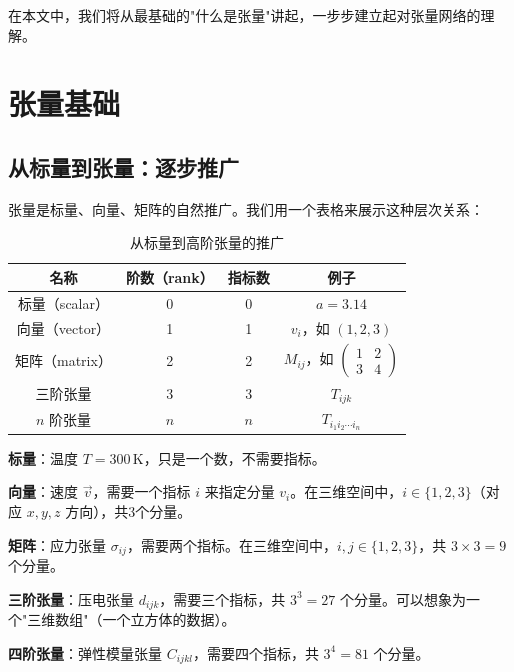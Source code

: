 \documentclass[12pt,a4paper]{ctexart}
\begin{document}
在本文中，我们将从最基础的"什么是张量"讲起，一步步建立起对张量网络的理解。

\section{张量基础}

\subsection{从标量到张量：逐步推广}

张量是标量、向量、矩阵的自然推广。我们用一个表格来展示这种层次关系：

\begin{table}[H]
\centering
\begin{tabular}{cccc}
\toprule
\textbf{名称} & \textbf{阶数（rank）} & \textbf{指标数} & \textbf{例子} \\
\midrule
标量（scalar） & 0 & 0 & $a = 3.14$ \\
向量（vector） & 1 & 1 & $v_i$，如 $(1, 2, 3)$ \\
矩阵（matrix） & 2 & 2 & $M_{ij}$，如 $\begin{pmatrix} 1 & 2 \\ 3 & 4 \end{pmatrix}$ \\
三阶张量 & 3 & 3 & $T_{ijk}$ \\
$n$ 阶张量 & $n$ & $n$ & $T_{i_1 i_2 \cdots i_n}$ \\
\bottomrule
\end{tabular}
\caption{从标量到高阶张量的推广}
\end{table}

\begin{examplebox}[例1：理解张量的阶]
\textbf{标量}：温度 $T = 300\,\text{K}$，只是一个数，不需要指标。

\textbf{向量}：速度 $\vec{v}$，需要一个指标 $i$ 来指定分量 $v_i$。在三维空间中，$i \in \{1,2,3\}$（对应 $x,y,z$ 方向），共3个分量。

\textbf{矩阵}：应力张量 $\sigma_{ij}$，需要两个指标。在三维空间中，$i,j \in \{1,2,3\}$，共 $3\times 3 = 9$ 个分量。

\textbf{三阶张量}：压电张量 $d_{ijk}$，需要三个指标，共 $3^3 = 27$ 个分量。可以想象为一个"三维数组"（一个立方体的数据）。

\textbf{四阶张量}：弹性模量张量 $C_{ijkl}$，需要四个指标，共 $3^4 = 81$ 个分量。
\end{examplebox}
\end{document}
